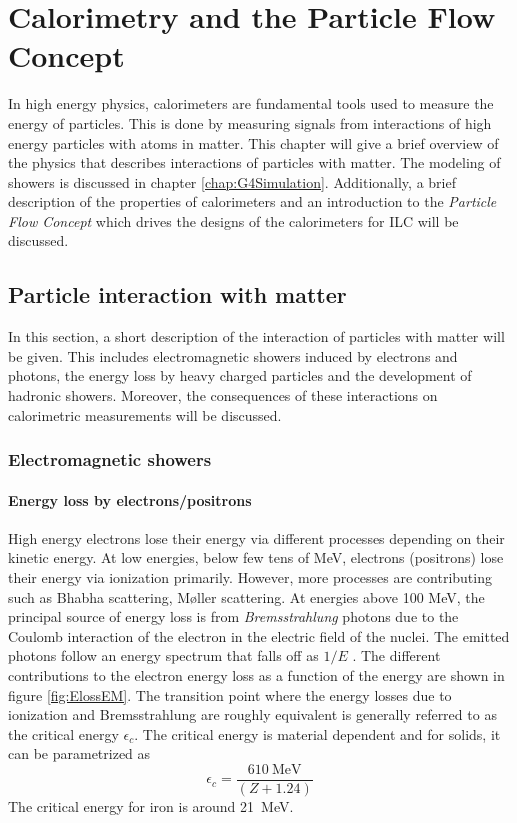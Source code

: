 \chapter{Calorimetry and the Particle Flow Concept}
\label{chap:CaloPFA}

In high energy physics, calorimeters are fundamental tools used to measure the energy of particles. This is done by measuring signals from interactions of high energy particles with atoms in matter. This chapter will give a brief overview of the physics that describes interactions of particles with matter. The modeling of showers is discussed in chapter \ref{chap:G4Simulation}. Additionally, a brief description of the properties of calorimeters and an introduction to the \textit{Particle Flow Concept} which drives the designs of the calorimeters for ILC will be discussed.

\section{Particle interaction with matter}
\label{sec:PartInter}

In this section, a short description of the interaction of particles with matter will be given. This includes electromagnetic showers induced by electrons and photons, the energy loss by heavy charged particles and the development of hadronic showers. Moreover, the consequences of these interactions on calorimetric measurements will be discussed.

\subsection{Electromagnetic showers}
\label{subsec:EMShowers}

\subsubsection{Energy loss by electrons/positrons}

High energy electrons lose their energy via different processes depending on their kinetic energy. At low energies, below few tens of MeV, electrons (positrons) lose their energy via ionization primarily. However, more processes are contributing such as Bhabha scattering, M\o{}ller scattering. At energies above 100 MeV, the principal source of energy loss is from \textit{Brems\-strah\-lung} photons due to the Coulomb interaction of the electron in the electric field of the nuclei. The emitted photons follow an energy spectrum that falls off as $1/E$ \cite{Wigmans:392793}. The different contributions to the electron energy loss as a function of the energy are shown in figure \ref{fig:ElossEM}. The transition point where the energy losses due to ionization and Bremsstrahlung are roughly equivalent is generally referred to as the critical energy $\epsilon_{c}$. The critical energy is material dependent and for solids, it can be parametrized as
\begin{equation}
  \epsilon_{c} = \frac{\SI{610}{\mega\eV}}{(Z + 1.24)}
\end{equation}
The critical energy for iron is around \SI{21}{\mega\eV}.

